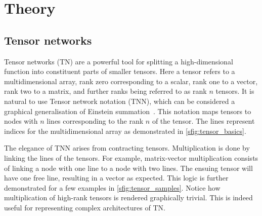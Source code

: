 



\section{Theory}

\subsection{Tensor networks}

Tensor networks (TN) are a powerful tool for splitting a high-dimensional function into constituent parts of smaller tensors. 
Here a tensor refers to a multidimensional array, rank zero corresponding to a scalar, rank one to a vector, rank two to a matrix, and further ranks being referred to as rank $n$ tensors.
It is natural to use Tensor network notation (TNN), which can be considered a graphical generalisation of Einstein summation~\cite{Bridgeman_2017}. This notation maps tensors to  nodes with $n$ lines corresponding to the rank $n$ of the tensor. The lines represent indices for the multidimensional array as demonstrated in \cref{sfig:tensor_basics}.

The elegance of TNN arises from contracting tensors. Multiplication is done by linking the lines of the tensors. For example, matrix-vector multiplication consists of linking a node with one line to a node with two lines. The ensuing tensor will have one free line, resulting in a vector as expected.
This logic is further demonstrated for a few examples in \cref{sfig:tensor_samples}.
Notice how multiplication of high-rank tensors is rendered graphically trivial. This is indeed useful for representing complex architectures of TN.



